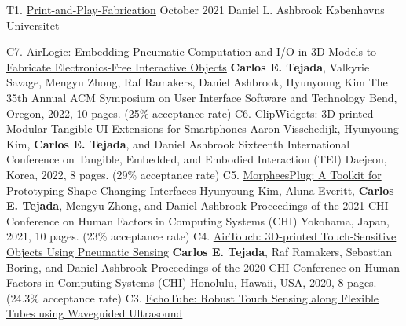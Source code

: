 

    \begin{cvpublications}
      \cvthesis%
        {T1.}
        {\href{https://doi.org/10.31237/osf.io/nd7e9}{Print-and-Play-Fabrication}}%
        {October 2021}
        {Daniel L. Ashbrook}
        {K{\o}benhavns Universitet}
    \end{cvpublications}
    
 

    \begin{cvpublications}
      \cvpublication%
        {C7.}%
        {\href{https://doi.org/10.1145/3526113.3545642}{AirLogic: Embedding Pneumatic Computation and I/O in 3D Models to Fabricate Electronics-Free Interactive Objects}}%
        {\textbf{Carlos E. Tejada}, Valkyrie Savage, Mengyu Zhong, Raf Ramakers, Daniel Ashbrook, Hyunyoung Kim}
        {The 35th Annual ACM Symposium on User Interface Software and Technology}
        {Bend, Oregon, 2022, 10 pages. (25\% acceptance rate)}
      \cvpublication%
        {C6.}%
        {\href{https://doi.org/10.1145/3490149.3501314}{ClipWidgets: 3D-printed Modular Tangible UI Extensions for Smartphones}}%
        {Aaron Visschedijk, Hyunyoung Kim, \textbf{Carlos E. Tejada}, and Daniel Ashbrook}%
        {Sixteenth International Conference on Tangible, Embedded, and Embodied Interaction (TEI)}
        {Daejeon, Korea, 2022, 8 pages. (29\% acceptance rate)}
      \cvpublication%
        {C5.}%
        {\href{https://doi.org/10.1145/3313831.3376136}{MorpheesPlug: A Toolkit for Prototyping Shape-Changing Interfaces}}%
        {Hyunyoung Kim, Aluna Everitt, \textbf{Carlos E. Tejada}, Mengyu Zhong, and Daniel Ashbrook}%
        {Proceedings of the 2021 CHI Conference on Human Factors in Computing Systems (CHI)}%
        {Yokohama, Japan, 2021, 10 pages. (23\% acceptance rate)}
      \cvpublication%
        {C4.}%
        {\href{https://doi.org/10.1145/3313831.3376136}{AirTouch: 3D-printed Touch-Sensitive Objects Using Pneumatic Sensing}}%
        {\textbf{Carlos E. Tejada}, Raf Ramakers, Sebastian Boring, and Daniel Ashbrook}%
        {Proceedings of the 2020 CHI Conference on Human Factors in Computing Systems (CHI)}%
        {Honolulu, Hawaii, USA, 2020, 8 pages. (24.3\% acceptance rate)}
      \cvpublication%
        {C3.}
        {\href{https://doi.org/10.1145/3343055.3359712}{EchoTube: Robust Touch Sensing along Flexible Tubes using Waveguided Ultrasound}}%

\end{cvpublications}
